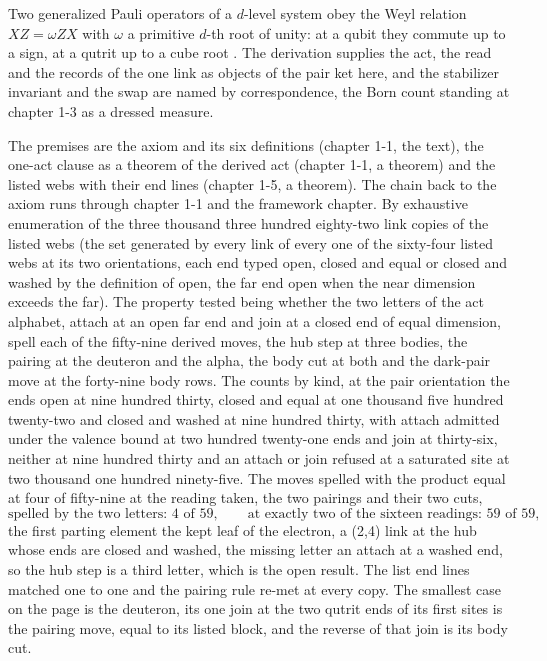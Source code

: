 \begin{chbridge}
Two generalized Pauli operators of a $d$-level system obey the Weyl relation $XZ = \omega ZX$ with $\omega$ a primitive $d$-th root of unity: at a qubit they commute up to a sign, at a qutrit up to a cube root \cite{Weyl1927}. The derivation supplies the act, the read and the records of the one link as objects of the pair ket here, and the stabilizer invariant and the swap are named by correspondence, the Born count standing at chapter 1-3 as a dressed measure.
\end{chbridge}
\begin{chproof}[census]
The premises are the axiom and its six definitions (chapter 1-1, the text), the one-act clause as a theorem of the derived act (chapter 1-1, a theorem) and the listed webs with their end lines (chapter 1-5, a theorem). The chain back to the axiom runs through chapter 1-1 and the framework chapter. By exhaustive enumeration of the three thousand three hundred eighty-two link copies of the listed webs (the set generated by every link of every one of the sixty-four listed webs at its two orientations, each end typed open, closed and equal or closed and washed by the definition of open, the far end open when the near dimension exceeds the far). The property tested being whether the two letters of the act alphabet, attach at an open far end and join at a closed end of equal dimension, spell each of the fifty-nine derived moves, the hub step at three bodies, the pairing at the deuteron and the alpha, the body cut at both and the dark-pair move at the forty-nine body rows. The counts by kind, at the pair orientation the ends open at nine hundred thirty, closed and equal at one thousand five hundred twenty-two and closed and washed at nine hundred thirty, with attach admitted under the valence bound at two hundred twenty-one ends and join at thirty-six, neither at nine hundred thirty and an attach or join refused at a saturated site at two thousand one hundred ninety-five. The moves spelled with the product equal at four of fifty-nine at the reading taken, the two pairings and their two cuts,
\begin{equation}
\text{spelled by the two letters: } 4 \text{ of } 59,\qquad \text{at exactly two of the sixteen readings: } 59 \text{ of } 59 ,
\end{equation}
the first parting element the kept leaf of the electron, a (2,4) link at the hub whose ends are closed and washed, the missing letter an attach at a washed end, so the hub step is a third letter, which is the open result. The list end lines matched one to one and the pairing rule re-met at every copy. The smallest case on the page is the deuteron, its one join at the two qutrit ends of its first sites is the pairing move, equal to its listed block, and the reverse of that join is its body cut.


\end{chproof}
